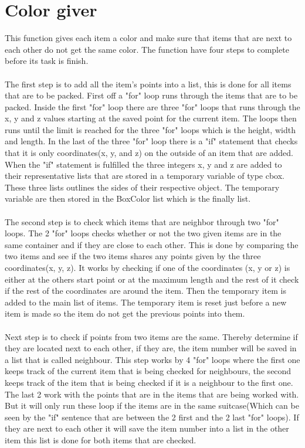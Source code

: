 \section{Color giver}
This function gives each item a color and make sure that items that are next to each other do not get the same color. The function have four steps to complete before its task is finish.\\
\\
The first step is to add all the item's points into a list, this is done for all items that are to be packed. First off a "for" loop runs through the items that are to be packed. Inside the first "for" loop there are three "for" loops that runs through the x, y and z values starting at the saved point for the current item. The loops then runs until the limit is reached for the three "for" loops which is the height, width and length. In the last of the three "for" loop there is a "if" statement that checks that it is only coordinates(x, y, and z) on the outside of an item that are added. When the "if" statement is fulfilled the three integers x, y and z are added to their representative lists that are stored in a temporary variable of type cbox. These three lists outlines the sides of their respective object. The temporary variable are then stored in the BoxColor list which is the finally list.\\ 
\\
The second step is to check which items that are neighbor through two "for" loops. The 2 "for" loops checks whether or not the two given items are in the same container and if they are close to each other. This is done by comparing the two items and see if the two items shares any points given by the three coordinates(x, y, z). It works by checking if one of the coordinates (x, y or z) is either at the others start point or at the maximum length and the rest of it check if the rest of the coordinates are around the item. Then the temporary item is added to the main list of items.  The temporary item is reset just before a new item is made so the item do not get the previous points into them.\\
\\
Next step is to check if points from two items are the same. Thereby determine if they are located next to each other, if they are, the item number will be saved in a list that is called neighbour. This step works by 4 "for" loops where the first one keeps track of the current item that is being checked for neighbours, the second keeps track of the item that is being checked if it is a neighbour to the first one. The last 2 work with the points that are in the items that are being worked with. But it will only run these loop if the items are in the same suitcase(Which can be seen by the "if" sentence that are between the 2 first and the 2 last "for" loops). If they are next to each other it will save the item number into a list in the other item this list is done for both items that are checked.\\
